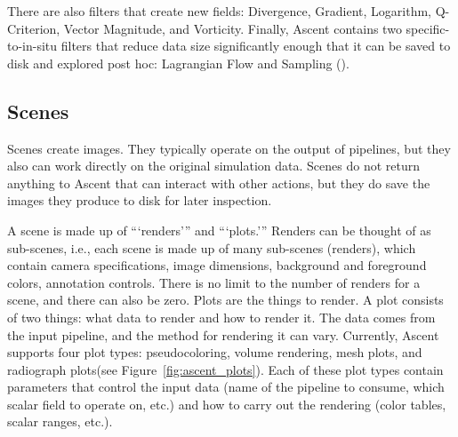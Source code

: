 There are also filters that create new fields: Divergence, Gradient, Logarithm, Q-Criterion, Vector Magnitude, and Vorticity.
%
Finally, Ascent contains two specific-to-in-situ filters that
reduce data size significantly enough that it can be saved to disk and explored post hoc:
Lagrangian Flow and Sampling ().


\subsection{Scenes}

Scenes create images.
%
They typically operate on the output of pipelines, but they also can work directly
on the original simulation data.
%
Scenes do not return anything to Ascent that can interact with other actions, but they
do save the images they produce to disk for later inspection.

A scene is made up of ```renders''' and ```plots.'''
%
Renders can be thought of as sub-scenes, i.e., each scene is made up of many sub-scenes (renders),
which contain
camera specifications, image dimensions, background and
foreground colors, annotation controls.
%
There is no limit to the number of renders for a scene, and there can also be zero.
%
Plots are the things to render.
%
A plot consists of two things: what data to render and how to render it.
%
The data comes from the input pipeline, and the method for rendering it can vary.
%
Currently, Ascent supports four plot types: pseudocoloring, volume rendering, mesh plots,
and radiograph plots(see Figure~\ref{fig:ascent_plots}).
%
Each of these plot types contain parameters that control the input data
(name of the pipeline to consume, which scalar field to operate on, etc.)
and how to carry out the rendering (color tables, scalar ranges, etc.).
%

